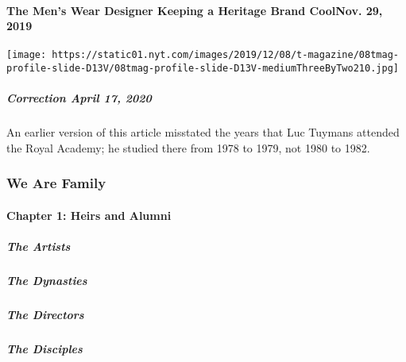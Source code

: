 \hypertarget{the-mens-wear-designer-keeping-a-heritage-brand-coolnov-29-2019}{%
\paragraph{The Men's Wear Designer Keeping a Heritage Brand CoolNov. 29,
2019}\label{the-mens-wear-designer-keeping-a-heritage-brand-coolnov-29-2019}}

\texttt{[image: https://static01.nyt.com/images/2019/12/08/t-magazine/08tmag-profile-slide-D13V/08tmag-profile-slide-D13V-mediumThreeByTwo210.jpg]}

\hypertarget{correction-april-17-2020}{%
\subparagraph{\texorpdfstring{\textbf{Correction} April 17,
2020}{Correction April 17, 2020}}\label{correction-april-17-2020}}

An earlier version of this article misstated the years that Luc Tuymans
attended the Royal Academy; he studied there from 1978 to 1979, not 1980
to 1982.

\hypertarget{we-are-family-1}{%
\subsubsection{We Are Family}\label{we-are-family-1}}

\hypertarget{chapter-1-heirs-and-alumni-1}{%
\paragraph{Chapter 1: Heirs and
Alumni}\label{chapter-1-heirs-and-alumni-1}}

\href{/interactive/2020/04/13/t-magazine/black-art-galleries.html}{}

\hypertarget{the-artists}{%
\subparagraph{The Artists}\label{the-artists}}

\href{/interactive/2020/04/13/t-magazine/italian-fashion-design-houses.html}{}

\hypertarget{the-dynasties}{%
\subparagraph{The Dynasties}\label{the-dynasties}}

\href{/interactive/2020/04/13/t-magazine/gordon-parks.html}{}

\hypertarget{the-directors}{%
\subparagraph{The Directors}\label{the-directors}}

\href{/interactive/2020/04/13/t-magazine/enrique-olvera-chef.html}{}

\hypertarget{the-disciples}{%
\subparagraph{The Disciples}\label{the-disciples}}

\href{/interactive/2020/04/13/t-magazine/royal-academy-antwerp.html}{}

